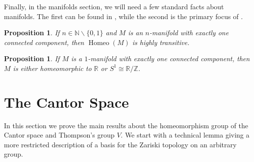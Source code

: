 \documentclass[11pt]{amsart}
\newtheorem{prop}[theorem]{Proposition}
\newcommand{\N}{\mathbb N}
\begin{document}
Finally, in the manifolds section, we will need a few standard facts about manifolds. 
The first can be found in \cite{mann2021structure}, while the second is the primary focus of \cite{gale1987classification}.
\begin{prop}\label{hightrans}
    If \(n\in \N\backslash \{0,1\}\) and \(M\) is an \(n\)-manifold with exactly one connected component, then \(\operatorname{Homeo}(M)\) is highly transitive. 
\end{prop}
\begin{prop}\label{1manclass}
    If \(M\) is a \(1\)-manifold with exactly one connected component, then \(M\) is either homeomorphic to \( \mathbb{R}\) or \(S^1\cong \mathbb{R}/\mathbb{Z}\).
\end{prop}




\section{The Cantor Space}

In this section we prove the main results about the homeomorphism group of the Cantor space and Thompson's group $V$.
We start with a technical lemma giving a more restricted description of a basis for the Zariski topology on an arbitrary group.
\end{document}
